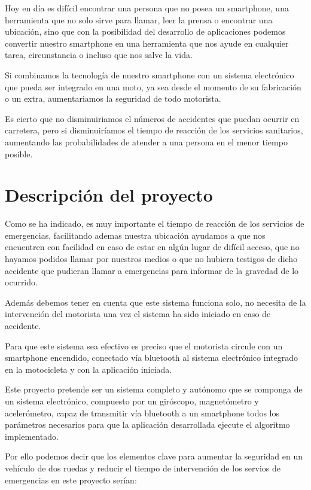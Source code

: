 		Hoy en día es difícil encontrar una persona que no posea un smartphone, una herramienta que no solo sirve para llamar, leer la prensa o encontrar una ubicación, sino que con la posibilidad del desarrollo de aplicaciones podemos convertir nuestro smartphone en una herramienta que nos ayude en cualquier tarea, circunstancia o incluso que nos salve la vida.
		
		Si combinamos la tecnología de nuestro smartphone con un sistema electrónico que pueda ser integrado en una moto, ya sea desde el momento de su fabricación o un extra, aumentariamos la seguridad de todo motorista.
		
		Es cierto que no disminuiriamos el números de accidentes que puedan ocurrir en carretera, pero si disminuiríamos el tiempo de reacción de los servicios sanitarios, aumentando las probabilidades de atender a una persona en el menor tiempo posible.
		
	\section{Descripción del proyecto}
	
		Como se ha indicado, es muy importante el tiempo de reacción de los servicios de emergencias, facilitando ademas nuestra ubicación ayudamos a que nos encuentren con facilidad en caso de estar en algún lugar de difícil acceso, que no hayamos podidos llamar por nuestros medios o que no hubiera testigos de dicho accidente que pudieran llamar a emergencias para informar de la gravedad de lo ocurrido.
		
		Además debemos tener en cuenta que este sistema funciona solo, no necesita de la intervención del motorista una vez el sistema ha sido iniciado en caso de accidente.
		
		Para que este sistema sea efectivo es preciso que el motorista circule con un smartphone encendido, conectado vía bluetooth al sistema electrónico integrado en la motocicleta y con la aplicación iniciada.
		
		Este proyecto pretende ser un sistema completo y autónomo que se componga de un sistema electrónico, compuesto por un giróscopo, magnetómetro y acelerómetro, capaz de transmitir vía bluetooth a un smartphone todos los parámetros necesarios para que la aplicación desarrollada ejecute el algoritmo implementado.
				
		Por ello podemos decir que los elementos clave para aumentar la seguridad en un vehículo de dos ruedas y reducir el tiempo de intervención de los servios de emergencias en este proyecto serían:

